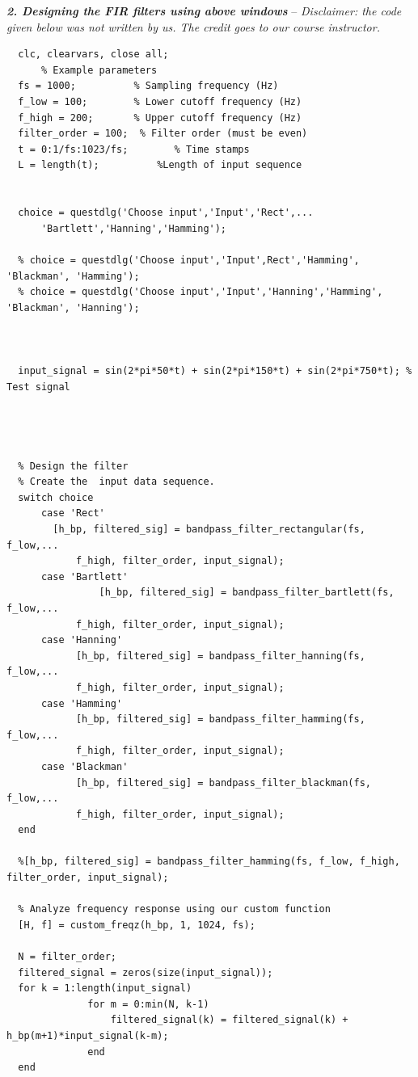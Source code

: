 \documentclass[12pt]{report}
\begin{document}
  \newpage
  \textbf{\textit{2. Designing the FIR filters using above windows}} -- \emph{Disclaimer: the code given below was not written by us. The credit goes to our course instructor.}
  \vspace{0.2cm}
  \begin{lstlisting}
  clc, clearvars, close all;
      % Example parameters
  fs = 1000;          % Sampling frequency (Hz)
  f_low = 100;        % Lower cutoff frequency (Hz)
  f_high = 200;       % Upper cutoff frequency (Hz)
  filter_order = 100;  % Filter order (must be even)
  t = 0:1/fs:1023/fs;        % Time stamps
  L = length(t);          %Length of input sequence


  choice = questdlg('Choose input','Input','Rect',...
      'Bartlett','Hanning','Hamming');

  % choice = questdlg('Choose input','Input',Rect','Hamming', 'Blackman', 'Hamming');
  % choice = questdlg('Choose input','Input','Hanning','Hamming', 'Blackman', 'Hanning');



  input_signal = sin(2*pi*50*t) + sin(2*pi*150*t) + sin(2*pi*750*t); % Test signal


          
  
  % Design the filter
  % Create the  input data sequence.
  switch choice
      case 'Rect'
        [h_bp, filtered_sig] = bandpass_filter_rectangular(fs, f_low,...
            f_high, filter_order, input_signal);
      case 'Bartlett'
                [h_bp, filtered_sig] = bandpass_filter_bartlett(fs, f_low,...
            f_high, filter_order, input_signal);
      case 'Hanning'
            [h_bp, filtered_sig] = bandpass_filter_hanning(fs, f_low,...
            f_high, filter_order, input_signal);
      case 'Hamming'
            [h_bp, filtered_sig] = bandpass_filter_hamming(fs, f_low,...
            f_high, filter_order, input_signal);
      case 'Blackman'
            [h_bp, filtered_sig] = bandpass_filter_blackman(fs, f_low,...
            f_high, filter_order, input_signal);
  end

  %[h_bp, filtered_sig] = bandpass_filter_hamming(fs, f_low, f_high, filter_order, input_signal);

  % Analyze frequency response using our custom function
  [H, f] = custom_freqz(h_bp, 1, 1024, fs);

  N = filter_order;
  filtered_signal = zeros(size(input_signal));
  for k = 1:length(input_signal)
              for m = 0:min(N, k-1)
                  filtered_signal(k) = filtered_signal(k) + h_bp(m+1)*input_signal(k-m);
              end
  end
          


\end{lstlisting}
\end{document}
